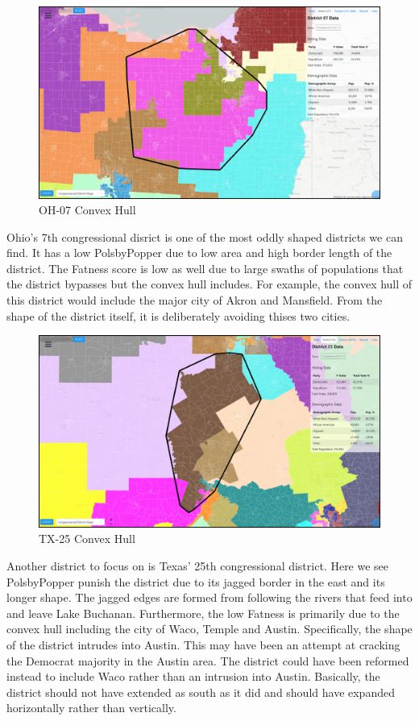 \documentclass[letterpaper]{article}
\begin{document}
\begin{figure}[H]
	\includegraphics[width=\linewidth]{./figures/OH-07-ConvexHull.png}
	\caption{OH-07 Convex Hull}
	\label{fig:oh07ch}
\end{figure}
Ohio's 7th congressional disrict is one of the most oddly shaped districts we can find. It has a low PolsbyPopper due to low area and high border length of the district. The Fatness score is low as well due to large swaths of populations that the district bypasses but the convex hull includes. For example, the convex hull of this district would include the major city of Akron and Mansfield. From the shape of the district itself, it is deliberately avoiding thises two cities.

\begin{figure}[H]
	\includegraphics[width=\linewidth]{./figures/TX-25-ConvexHull.png}
	\caption{TX-25 Convex Hull}
	\label{fig:tx25ch}
\end{figure}

Another district to focus on is Texas' 25th congressional district. Here we see PolsbyPopper punish the district due to its jagged border in the east and its longer shape. The jagged edges are formed from following the rivers that feed into and leave Lake Buchanan. Furthermore, the low Fatness is primarily due to the convex hull including the city of Waco, Temple and Austin. Specifically, the shape of the district intrudes into Austin. This may have been an attempt at cracking the Democrat majority in the Austin area. The district could have been reformed instead to include Waco rather than an intrusion into Austin. Basically, the district should not have extended as south as it did and should have expanded horizontally rather than vertically.
\end{document}

